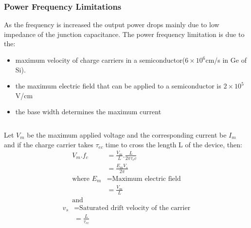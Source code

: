 \begin{frame}
  \frametitle{Power Frequency Limitations}
  As the frequency is increased the output power drops mainly due to low impedance of the junction capacitance. The power frequency limitation is due to the:
  \begin{itemize}
  \item maximum velocity of charge carriers in a semiconductor($6 \times 10^6$cm/s in Ge of Si).
  \item the maximum electric field that can be applied to a semiconductor is $2 \times 10^5$V/cm
  \item the base width determines the maximum current
  \end{itemize}
\end{frame}

\begin{frame}
  \begin{columns}

    Let $V_m$ be the maximum applied voltage and the corresponding current be $I_m$ and if the charge carrier takes $\tau_{ec}$ time to cross the length L of the device, then:
    \begin{align*}
      V_m . f_c &= \frac{V_m}{L}. \frac{L}{2\pi\tau_ec}\\
                &= \frac{E_mV_s}{2\pi}\\
      \text{where }
      E_m &= \text{Maximum electric field}\\
                &= \frac{V_m}{L}\\
      \text{and }
    \end{align*}
    \begin{align*}
      v_s &= \text{Saturated drift velocity of the carrier}\\
            &= \frac{L}{\tau_{ec}}
    \end{align*}
  \end{columns}
\end{frame}

